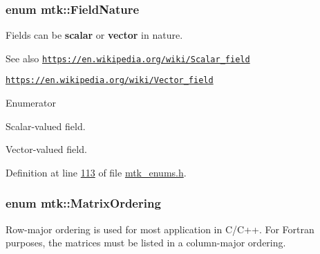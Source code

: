 \hypertarget{group__c02-enums_ga4c54f2a329cfb4e56213b02a259d19e2}{
\subsubsection[{Field\+Nature}]{\setlength{\rightskip}{0pt plus 5cm}enum {\bf mtk\+::\+Field\+Nature}\hspace{0.3cm}{\ttfamily [strong]}}}\label{group__c02-enums_ga4c54f2a329cfb4e56213b02a259d19e2}
Fields can be {\bfseries scalar} or {\bfseries vector} in nature.

\begin{DoxySeeAlso}{See also}
\href{https://en.wikipedia.org/wiki/Scalar_field}{\tt https\+://en.\+wikipedia.\+org/wiki/\+Scalar\+\_\+field}

\href{https://en.wikipedia.org/wiki/Vector_field}{\tt https\+://en.\+wikipedia.\+org/wiki/\+Vector\+\_\+field} 
\end{DoxySeeAlso}
\begin{Desc}
\item[Enumerator]\par
\begin{description}
\item[{\em 
\hypertarget{group__c02-enums_ga4c54f2a329cfb4e56213b02a259d19e2a8f3d9a4b6a7b7f2c7afa61ca113d0db9}{S\+C\+A\+L\+A\+R}\label{group__c02-enums_ga4c54f2a329cfb4e56213b02a259d19e2a8f3d9a4b6a7b7f2c7afa61ca113d0db9}
}]Scalar-\/valued field. \item[{\em 
\hypertarget{group__c02-enums_ga4c54f2a329cfb4e56213b02a259d19e2a87752381b583740610f1dfeb07fdad7e}{V\+E\+C\+T\+O\+R}\label{group__c02-enums_ga4c54f2a329cfb4e56213b02a259d19e2a87752381b583740610f1dfeb07fdad7e}
}]Vector-\/valued field. \end{description}
\end{Desc}


Definition at line \hyperlink{mtk__enums_8h_source_l00113}{113} of file \hyperlink{mtk__enums_8h_source}{mtk\+\_\+enums.\+h}.

\hypertarget{group__c02-enums_ga622801bd9f912d0f976c3e383f5f581c}{
\subsubsection[{Matrix\+Ordering}]{\setlength{\rightskip}{0pt plus 5cm}enum {\bf mtk\+::\+Matrix\+Ordering}\hspace{0.3cm}{\ttfamily [strong]}}}\label{group__c02-enums_ga622801bd9f912d0f976c3e383f5f581c}
Row-\/major ordering is used for most application in C/\+C++. For Fortran purposes, the matrices must be listed in a column-\/major ordering.

